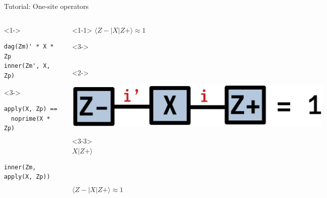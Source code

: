 \begin{frame}[fragile]{Tutorial: One-site operators}

\begin{columns}

\begin{column}{4.5cm}

\begin{onlyenv}<1->
\begin{lstlisting}[language=JuliaLocal, style=julia, basicstyle=\small]
dag(Zm)' * X * Zp
inner(Zm', X, Zp)
\end{lstlisting}
\end{onlyenv}

\begin{onlyenv}<3->
~\\
\begin{lstlisting}[language=JuliaLocal, style=julia, basicstyle=\small]
apply(X, Zp) == 
  noprime(X * Zp)



inner(Zm, apply(X, Zp))
\end{lstlisting}
\end{onlyenv}

\end{column}

\begin{column}{4.5cm}

\begin{onlyenv}<1-1>
$\langle Z-|X|Z+\rangle \approx 1$ \\
\end{onlyenv}

\begin{onlyenv}<3->
~\\
~\\
\end{onlyenv}

\begin{onlyenv}<2->
\vspace*{-0.2cm}
\begin{center}
\includegraphics[width=0.7\textwidth]{
  slides/assets/ZmXZp.png
}
\end{center}
\vspace*{0.0cm}
\end{onlyenv}

\begin{onlyenv}<3-3>
\vspace*{0.0cm}
~\\
$X|Z+\rangle$ \\
~\\
~\\
~\\
$\langle Z-|X|Z+\rangle \approx 1$ \\
~\\
\end{onlyenv}


\end{column}
\end{columns}
\end{frame}
